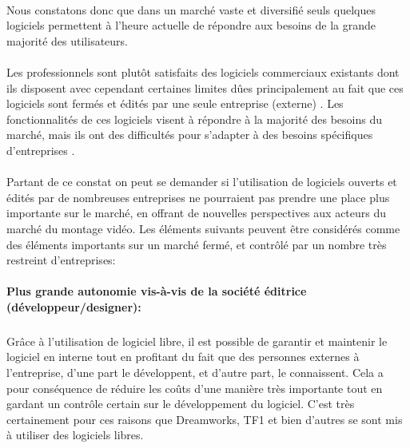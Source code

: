 \paragraph { }

Nous constatons donc que dans un marché vaste et diversifié seuls
quelques logiciels permettent à l'heure actuelle de répondre aux
besoins de la grande majorité des utilisateurs.

\paragraph{}

Les professionnels sont plutôt satisfaits des logiciels commerciaux
existants dont ils disposent avec cependant certaines limites dûes
principalement au fait que ces logiciels sont fermés et édités par une
seule entreprise (externe) . Les fonctionnalités de ces logiciels visent
à répondre à la majorité des besoins du marché, mais ils ont des
difficultés pour s'adapter à des besoins spécifiques d'entreprises .

\paragraph{}

Partant de ce constat on peut se demander si l'utilisation de logiciels
ouverts et édités par de nombreuses entreprises ne pourraient pas
prendre une place plus importante sur le marché, en offrant de nouvelles
perspectives aux acteurs du marché du montage vidéo. Les éléments
suivants peuvent être considérés comme des éléments importants sur un
marché fermé, et contrôlé par un nombre très restreint d'entreprises:

\paragraph{Plus grande autonomie vis-à-vis de la société éditrice
(développeur/designer):}

  \subparagraph{ }

    Grâce à l'utilisation de logiciel libre, il est possible de garantir
    et maintenir le logiciel en interne tout en profitant du fait que des
    personnes externes à l'entreprise, d'une part le développent, et
    d'autre part, le connaissent. Cela a pour conséquence de réduire les
    coûts d'une manière très importante tout en gardant un contrôle
    certain sur le développement du logiciel. C'est très certainement
    pour ces raisons que Dreamworks, TF1 et bien d'autres se sont mis
    à utiliser des logiciels libres.

